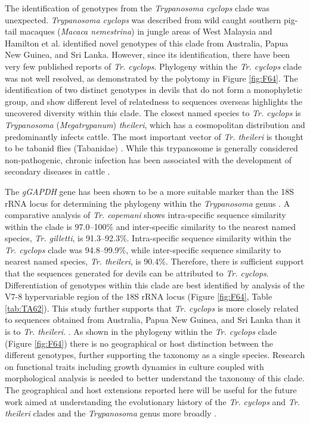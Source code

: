 \documentclass[a4paper, nobind]{templates/ociamthesis}
\begin{document}
The identification of genotypes from the \emph{Trypanosoma cyclops} clade was unexpected. \emph{Trypanosoma cyclops} was described from wild caught southern pig-tail macaques (\emph{Macaca nemestrina}) in jungle areas of West Malaysia \autocite{weinmanTrypanosomaCyclopsSp1972} and Hamilton et al. \autocite*{hamiltonNewLineageTrypanosomes2005} identified novel genotypes of this clade from Australia, Papua New Guinea, and Sri Lanka. However, since its identification, there have been very few published reports of \emph{Tr. cyclops}. Phylogeny within the \emph{Tr. cyclops} clade was not well resolved, as demonstrated by the polytomy in Figure \ref{fig:F64}. The identification of two distinct genotypes in devils that do not form a monophyletic group, and show different level of relatedness to sequences overseas highlights the uncovered diversity within this clade. The closest named species to \emph{Tr. cyclops} is \emph{Trypanosoma} (\emph{Megatrypanum}) \emph{theileri}, which has a cosmopolitan distribution and predominantly infects cattle. The most important vector of \emph{Tr. theileri} is thought to be tabanid flies (Tabanidae) \autocite{hoareTrypanosomesMammalsZoological1972,werszkoMolecularDetectionMegatrypanum2020}. While this trypanosome is generally considered non-pathogenic, chronic infection has been associated with the development of secondary diseases in cattle \autocite{rodriguesCharacterizationSplicedLeader2010}.

The \emph{gGAPDH} gene has been shown to be a more suitable marker than the 18S rRNA locus for determining the phylogeny within the \emph{Trypanosoma} genus \autocite{hamiltonTrypanosomesAreMonophyletic2004}. A comparative analysis of \emph{Tr. copemani} shows intra-specific sequence similarity within the clade is 97.0--100\% and inter-specific similarity to the nearest named species, \emph{Tr. gilletti}, is 91.3--92.3\%. Intra-specific sequence similarity within the \emph{Tr. cyclops} clade was 94.8--99.9\%, while inter-specific sequence similarity to nearest named species, \emph{Tr. theileri}, is 90.4\%. Therefore, there is sufficient support that the sequences generated for devils can be attributed to \emph{Tr. cyclops}. Differentiation of genotypes within this clade are best identified by analysis of the V7-8 hypervariable region of the 18S rRNA locus (Figure \ref{fig:F64}, Table \ref{tab:TA62}). This study further supports that \emph{Tr. cyclops} is more closely related to sequences obtained from Australia, Papua New Guinea, and Sri Lanka than it is to \emph{Tr. theileri}. \autocite{hamiltonNewLineageTrypanosomes2005}. As shown in the phylogeny within the \emph{Tr. cyclops} clade (Figure \ref{fig:F64}) there is no geographical or host distinction between the different genotypes, further supporting the taxonomy as a single species. Research on functional traits including growth dynamics in culture coupled with morphological analysis is needed to better understand the taxonomy of this clade. The geographical and host extensions reported here will be useful for the future work aimed at understanding the evolutionary history of the \emph{Tr. cyclops} and \emph{Tr. theileri} clades and the \emph{Trypanosoma} genus more broadly \autocite{hamiltonEvolutionTrypanosomaCruzi2012}.
\end{document}
